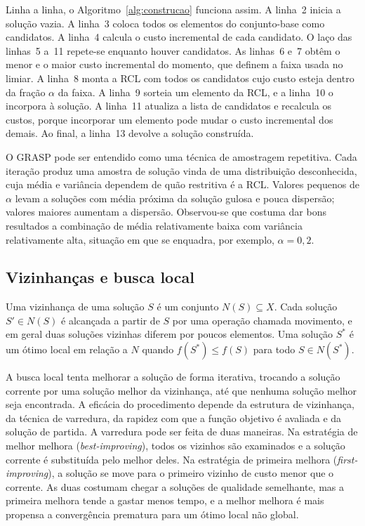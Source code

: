 \documentclass[11pt,a4paper]{article}
\begin{document}
Linha a linha, o Algoritmo~\ref{alg:construcao} funciona assim. A linha~2 inicia a solução vazia. A linha~3 coloca todos os elementos do conjunto-base como candidatos. A linha~4 calcula o custo incremental de cada candidato. O laço das linhas~5 a~11 repete-se enquanto houver candidatos. As linhas~6 e~7 obtêm o menor e o maior custo incremental do momento, que definem a faixa usada no limiar. A linha~8 monta a RCL com todos os candidatos cujo custo esteja dentro da fração $\alpha$ da faixa. A linha~9 sorteia um elemento da RCL, e a linha~10 o incorpora à solução. A linha~11 atualiza a lista de candidatos e recalcula os custos, porque incorporar um elemento pode mudar o custo incremental dos demais. Ao final, a linha~13 devolve a solução construída.

O GRASP pode ser entendido como uma técnica de amostragem repetitiva. Cada iteração produz uma amostra de solução vinda de uma distribuição desconhecida, cuja média e variância dependem de quão restritiva é a RCL. Valores pequenos de $\alpha$ levam a soluções com média próxima da solução gulosa e pouca dispersão; valores maiores aumentam a dispersão. Observou-se que costuma dar bons resultados a combinação de média relativamente baixa com variância relativamente alta, situação em que se enquadra, por exemplo, $\alpha = 0{,}2$.

\subsection{Vizinhanças e busca local}

Uma vizinhança de uma solução $S$ é um conjunto $N(S) \subseteq X$. Cada solução $S' \in N(S)$ é alcançada a partir de $S$ por uma operação chamada movimento, e em geral duas soluções vizinhas diferem por poucos elementos. Uma solução $S^\ast$ é um ótimo local em relação a $N$ quando $f(S^\ast) \le f(S)$ para todo $S \in N(S^\ast)$.

A busca local tenta melhorar a solução de forma iterativa, trocando a solução corrente por uma solução melhor da vizinhança, até que nenhuma solução melhor seja encontrada. A eficácia do procedimento depende da estrutura de vizinhança, da técnica de varredura, da rapidez com que a função objetivo é avaliada e da solução de partida. A varredura pode ser feita de duas maneiras. Na estratégia de melhor melhora (\emph{best-improving}), todos os vizinhos são examinados e a solução corrente é substituída pelo melhor deles. Na estratégia de primeira melhora (\emph{first-improving}), a solução se move para o primeiro vizinho de custo menor que o corrente. As duas costumam chegar a soluções de qualidade semelhante, mas a primeira melhora tende a gastar menos tempo, e a melhor melhora é mais propensa a convergência prematura para um ótimo local não global.
\end{document}
